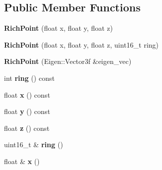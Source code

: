 \subsection*{Public Member Functions}
\begin{DoxyCompactItemize}
\item 
\mbox{\label{classdepth__clustering_1_1RichPoint_adf1e070f6382ca76d42fb10b195cb163}} 
{\bfseries Rich\+Point} (float x, float y, float z)
\item 
\mbox{\label{classdepth__clustering_1_1RichPoint_ad7e4053118640cb37135b3eef9a247c7}} 
{\bfseries Rich\+Point} (float x, float y, float z, uint16\+\_\+t ring)
\item 
\mbox{\label{classdepth__clustering_1_1RichPoint_a37e8581b974c3847daea7524787bc245}} 
{\bfseries Rich\+Point} (Eigen\+::\+Vector3f \&eigen\+\_\+vec)
\item 
\mbox{\label{classdepth__clustering_1_1RichPoint_ad7ce8be96957f7ae666ad6b8501fa356}} 
int {\bfseries ring} () const
\item 
\mbox{\label{classdepth__clustering_1_1RichPoint_af275291243d335de109b9228795ade94}} 
float {\bfseries x} () const
\item 
\mbox{\label{classdepth__clustering_1_1RichPoint_aaea684d74971bac09d5e211e479159db}} 
float {\bfseries y} () const
\item 
\mbox{\label{classdepth__clustering_1_1RichPoint_a49418eaf11077c0fdd4a541ddbe1c4d3}} 
float {\bfseries z} () const
\item 
\mbox{\label{classdepth__clustering_1_1RichPoint_ab3d41d1f3464897ea9f57ce077eece87}} 
uint16\+\_\+t \& {\bfseries ring} ()
\item 
\mbox{\label{classdepth__clustering_1_1RichPoint_a175236ebb25c06591fed2306b19bb398}} 
float \& {\bfseries x} ()
\item 

\end{DoxyCompactItemize}
